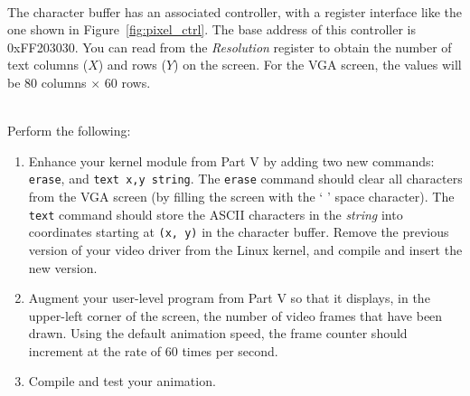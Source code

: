 \documentclass[epsfig,10pt,fullpage]{article}
\newcommand{\CommonDocsPath}{../../common/docs}
\begin{document}
~\\
\noindent
The character buffer has an associated controller, with a
register interface like the one shown in Figure~\ref{fig:pixel_ctrl}. The base address of
this controller is {\sf 0xFF203030}.  You can read from the
{\it Resolution} register to obtain the number of text columns ($X$) and rows ($Y$) on
the screen. For the VGA screen, the values will be 80 columns $\times$ 60 rows.

~\\
\noindent
Perform the following:

\begin{enumerate}
\item Enhance your kernel module from Part V by adding two new commands: \texttt{erase}, and 
\texttt{text x,y string}. The \texttt{erase} command should clear all characters from the VGA 
screen (by filling the screen with the ` ' space character).
The \texttt{text} command should store the ASCII characters in the {\it string} into coordinates
starting at \texttt{(x, y)} in the character buffer. Remove the previous version of your 
video driver from the Linux kernel, and compile and insert the new version.
\item Augment your user-level program from Part V so that it displays, in the upper-left corner 
of the screen, the number of video frames that have been drawn. Using the default animation speed,
the frame counter should increment at the rate of 60 times per second.
\item Compile and test your animation.
\end{enumerate}


\vskip 0.8in
\noindent
\newpage

\end{document}
